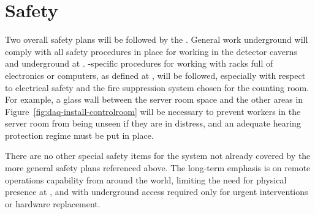 \section{Safety}
\label{sec:fd-daq-safety}

Two overall safety plans will be followed by the  . General work underground will comply with all safety procedures in place for working in the detector caverns and  underground at \surf. -specific procedures for working with racks full of electronics or computers, as defined at \fnal, will be followed, especially with respect to electrical safety and the fire suppression system chosen for the counting room. For example, a glass wall between the server room space and the other areas in Figure~\ref{fig:daq-install-controlroom} will be necessary to prevent workers in the server room from being unseen if they are in distress, and an adequate hearing protection regime must be put in place.

There are no other special safety items for the  system not already covered by the more general safety plans referenced above. The long-term emphasis is on remote operations capability from around the world, limiting the need for physical presence at \surf, and with underground access required only for urgent interventions or hardware replacement.
